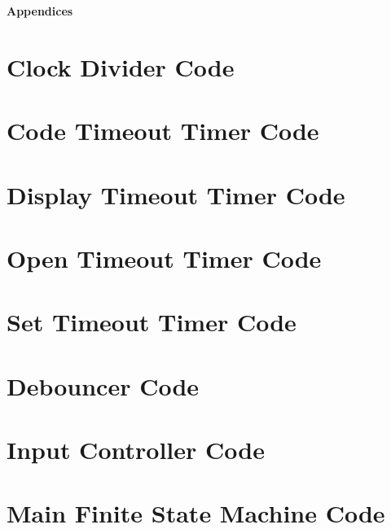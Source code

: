 \documentclass[11pt]{article}
\begin{document}
\pagebreak

\textbf{Appendices}

\begin{appendices}

\section{Clock Divider Code}



\section{Code Timeout Timer Code}



\section{Display Timeout Timer Code}



\section{Open Timeout Timer Code}



\section{Set Timeout Timer Code}



\section{Debouncer Code}



\section{Input Controller Code}



\section{Main Finite State Machine Code}


\end{appendices}
\end{document}
